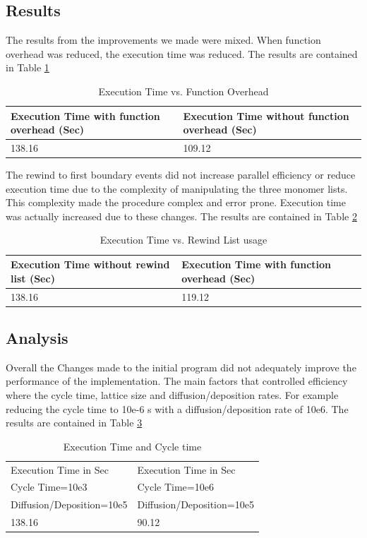 \subsection{Results}
The results from the improvements we made were mixed. When function overhead was reduced, the execution time was reduced.   The results are contained in Table \ref{table:Function Overhead}

\begin{table}
\begin{tabular}{|l|l|}
\hline
Execution Time with function overhead (Sec) & Execution Time without function overhead (Sec) \\
\hline
138.16 & 109.12\\
\hline
\end{tabular}
\caption{Execution Time vs. Function Overhead}
\label{table:Function Overhead}
\end{table}

The rewind to first boundary events did not increase parallel efficiency or reduce execution time due to  the complexity of manipulating the three monomer lists. This complexity made the procedure complex and error prone. Execution time was actually increased due to these changes.   The results are contained in Table \ref{table:Rewind List}

\begin{table}
\begin{tabular}{|l|l|}
\hline
Execution Time without rewind list (Sec) & Execution Time with function overhead (Sec) \\
\hline
138.16 & 119.12\\
\hline
\end{tabular}
\caption{Execution Time vs. Rewind List usage}
\label{table:Rewind List}
\end{table}

\subsection{Analysis}
Overall the Changes made to the initial program did not adequately improve the performance of the implementation. The main factors that controlled efficiency where the cycle time, lattice size and diffusion/deposition rates.  For example reducing the cycle time to 10e-6 s with a diffusion/deposition rate of 10e6.  The results are contained in Table \ref{table:Cycle Time}

\begin{table}
\begin{tabular}{|l|l|}
\hline
Execution Time in Sec & Execution Time in Sec \\
Cycle Time=10e3 & Cycle Time=10e6 \\
Diffusion/Deposition=10e5 & Diffusion/Deposition=10e5 \\
\hline
138.16 & 90.12\\
\hline
\end{tabular}
\caption{Execution Time and Cycle time}
\label{table:Cycle Time}
\end{table}

